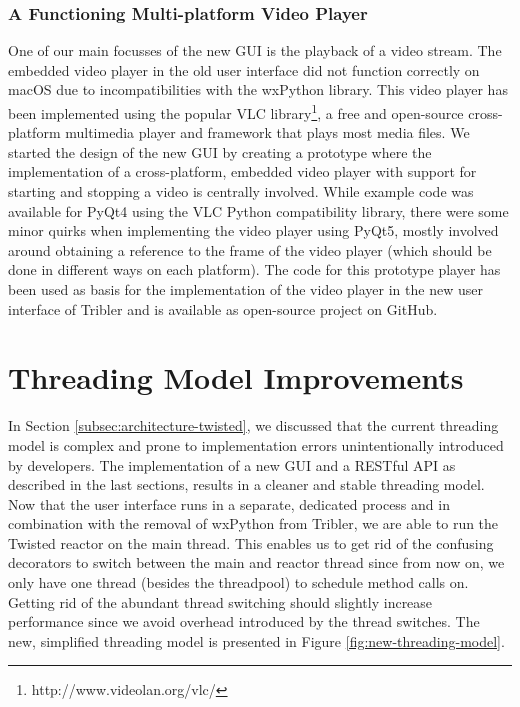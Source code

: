 \subsubsection{\textbf{A Functioning Multi-platform Video Player}}
One of our main focusses of the new GUI is the playback of a video stream. The embedded video player in the old user interface did not function correctly on macOS due to incompatibilities with the wxPython library. This video player has been implemented using the popular VLC library\footnote{http://www.videolan.org/vlc/}, a free and open-source cross-platform multimedia player and framework that plays most media files. We started the design of the new GUI by creating a prototype where the implementation of a cross-platform, embedded video player with support for starting and stopping a video is centrally involved. While example code was available for PyQt4 using the VLC Python compatibility library, there were some minor quirks when implementing the video player using PyQt5, mostly involved around obtaining a reference to the frame of the video player (which should be done in different ways on each platform). The code for this prototype player has been used as basis for the implementation of the video player in the new user interface of Tribler and is available as open-source project on GitHub\cite{vos2016vlc}.

\section{Threading Model Improvements}
\label{sec:threading-model-improvements}
In Section \ref{subsec:architecture-twisted}, we discussed that the current threading model is complex and prone to implementation errors unintentionally introduced by developers. The implementation of a new GUI and a RESTful API as described in the last sections, results in a cleaner and stable threading model. Now that the user interface runs in a separate, dedicated process and in combination with the removal of wxPython from Tribler, we are able to run the Twisted reactor on the main thread. This enables us to get rid of the confusing decorators to switch between the main and reactor thread since from now on, we only have one thread (besides the threadpool) to schedule method calls on. Getting rid of the abundant thread switching should slightly increase performance since we avoid overhead introduced by the thread switches. The new, simplified threading model is presented in Figure \ref{fig:new-threading-model}.

